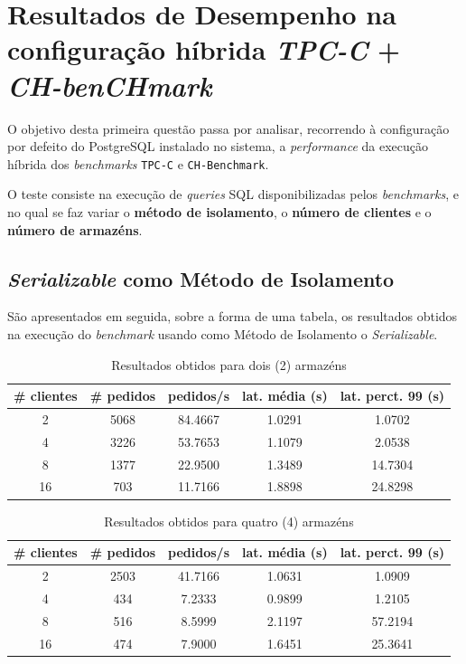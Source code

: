 \section{Resultados de Desempenho na configuração híbrida \textit{TPC-C} + \textit{CH-benCHmark}}

O objetivo desta primeira questão passa por analisar, recorrendo à configuração por defeito do PostgreSQL instalado no sistema, a \textit{performance} da execução híbrida dos \textit{benchmarks} \verb+TPC-C+ e \verb+CH-Benchmark+.

O teste consiste na execução de \textit{queries} SQL disponibilizadas pelos \textit{benchmarks}, e no qual se faz variar o \textbf{método de isolamento}, o \textbf{número de clientes} e o \textbf{número de armazéns}.

\subsection{\textit{Serializable} como Método de Isolamento}

São apresentados em seguida, sobre a forma de uma tabela, os resultados obtidos na execução do \textit{benchmark} usando como Método de Isolamento o \textit{Serializable}.

\begin{table}[!h]
\center
\small
\begin{tabular}{|c|c|c|c|c|}
\hline
\textbf{\# clientes} & \textbf{\# pedidos} & \textbf{pedidos/s} & \textbf{lat. média (s)} & \textbf{lat. perct. 99 (s)}  \\ \hline
2 & 5068 & 84.4667 & 1.0291 & 1.0702  \\ \hline
4 & 3226 & 53.7653 & 1.1079 & 2.0538  \\ \hline
8 & 1377 & 22.9500 & 1.3489 & 14.7304  \\ \hline
16 & 703 & 11.7166 & 1.8898 & 24.8298  \\ \hline
\end{tabular}
\caption{Resultados obtidos para dois (2) armazéns}
\end{table}

\begin{table}[!h]
\center
\small
\begin{tabular}{|c|c|c|c|c|}
\hline
\textbf{\# clientes} & \textbf{\# pedidos} & \textbf{pedidos/s} & \textbf{lat. média (s)} & \textbf{lat. perct. 99 (s)}  \\ \hline
2 & 2503 & 41.7166 & 1.0631 & 1.0909  \\ \hline
4 & 434 & 7.2333 & 0.9899 & 1.2105  \\ \hline
8 & 516 & 8.5999 & 2.1197 & 57.2194  \\ \hline
16 & 474 & 7.9000 & 1.6451 & 25.3641  \\ \hline
\end{tabular}
\caption{Resultados obtidos para quatro (4) armazéns}
\end{table}

